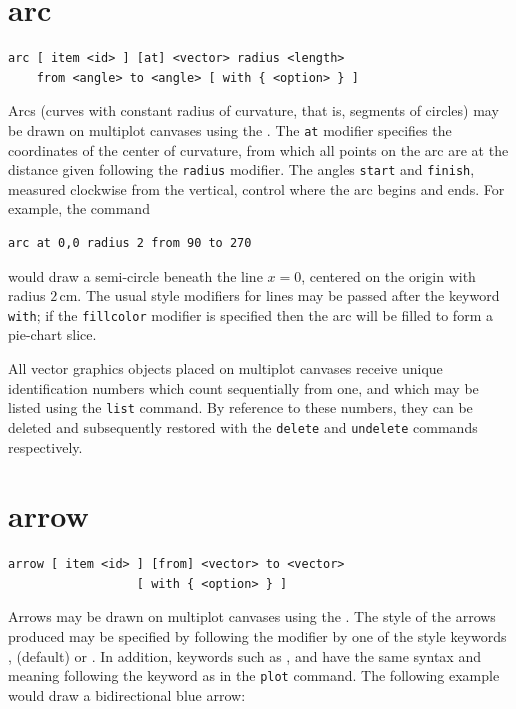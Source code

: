 \section{arc}

\begin{verbatim}
arc [ item <id> ] [at] <vector> radius <length>
    from <angle> to <angle> [ with { <option> } ]
\end{verbatim}

Arcs (curves with constant radius of curvature, that is, segments of circles)
may be drawn on multiplot canvases using the .  The {\tt at}
modifier specifies the coordinates of the center of curvature, from which all
points on the arc are at the distance given following the {\tt radius} modifier.
The angles {\tt start} and {\tt finish}, measured clockwise from the vertical,
control where the arc begins and ends.  For example, the command

\begin{verbatim}
arc at 0,0 radius 2 from 90 to 270
\end{verbatim}

\noindent would draw a semi-circle beneath the line $x=0$, centered on the
origin with radius $2\,\mathrm{cm}$.  The usual style modifiers for lines may
be passed after the keyword {\tt with}; if the {\tt fillcolor} modifier is
specified then the arc will be filled to form a pie-chart slice.

All vector graphics objects placed on multiplot canvases receive unique
identification numbers which count sequentially from one, and which may be
listed using the {\tt list} command.  By reference to these numbers, they can
be deleted and subsequently restored with the {\tt delete} and {\tt undelete}
commands respectively.


\section{arrow}

\begin{verbatim}
arrow [ item <id> ] [from] <vector> to <vector>
                  [ with { <option> } ]
\end{verbatim}

Arrows may be drawn on multiplot canvases using the . The style
of the arrows produced may be specified by following the 
modifier by one of the style keywords , 
(default) or . In addition, keywords such as ,
 and  have the same syntax and meaning
following the keyword  as in the {\tt plot} command. The
following example would draw a bidirectional blue arrow:

